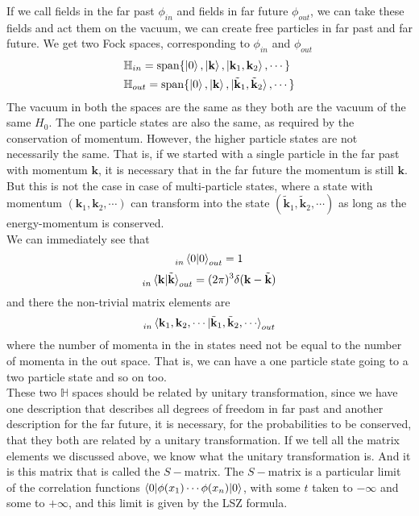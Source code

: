 \documentclass[11pt, notitlepage]{report}
\numberwithin{equation}{section}
\begin{document}
    If we call fields in the far past \(\phi_{in}\) and fields in far future \(\phi_{out}\), we can take these fields and act them on the vacuum, we can create free particles in far past and far future. We get two Fock spaces, corresponding to \(\phi_{in}\) and \(\phi_{out}\)
    \begin{align*}
        &\mathbb{H}_{in} = \mathrm{span} \{ \ket{0}, \ket{\textbf{k}}, \ket{\textbf{k}_1, \textbf{k}_2}, \cdots \}\\
        &\mathbb{H}_{out} = \mathrm{span} \{ \ket{0}, \ket{\textbf{k}}, \ket{\tilde{\textbf{k}}_1, \tilde{\textbf{k}}_2}, \cdots \}
    \end{align*}
    The vacuum in both the spaces are the same as they both are the vacuum of the same \(H_0\). The one particle states are also the same, as required by the conservation of momentum. However, the higher particle states are not necessarily the same. That is, if we started with a single particle in the far past with momentum \(\textbf{k}\), it is necessary that in the far future the momentum is still \(\textbf{k}\). But this is not the case in case of multi-particle states, where a state with momentum \((\textbf{k}_1, \textbf{k}_2, \cdots)\) can transform into the state \((\tilde{\textbf{k}}_1, \tilde{\textbf{k}}_2, \cdots)\) as long as the energy-momentum is conserved. \\
    We can immediately see that 
    \begin{equation*}
        \indices{_{in}}\braket{0|0}_{out} = 1
    \end{equation*}
    \begin{equation*}
        \indices{_{in}}\braket{\textbf{k} | \tilde{\textbf{k}}}_{out} = (2\pi)^3\delta(\textbf{k} - \tilde{\textbf{k}})
    \end{equation*} 
    and there the non-trivial matrix elements are 
    \begin{equation*}
       \indices{_{in}}\braket{\textbf{k}_1, \textbf{k}_2, \cdots | \tilde{\textbf{k}}_1, \tilde{\textbf{k}}_2, \cdots}_{out}
    \end{equation*}
    where the number of momenta in the in states need not be equal to the number of momenta in the out space. That is, we can have a one particle state going to a two particle state and so on too. \\

    These two \(\mathbb{H}\) spaces should be related by unitary transformation, since we have one description that describes all degrees of freedom in far past and another description for the far future, it is necessary, for the probabilities to be conserved, that they both are related by a unitary transformation. If we tell all the matrix elements we discussed above, we know what the unitary transformation is. And it is this matrix that is called the \(S-\)matrix. The \(S-\)matrix is a particular limit of the correlation functions \(\braket{0|\phi(x_1) \cdots \phi(x_n)|0}\), with some \(t\) taken to \(-\infty\) and some to \(+\infty\), and this limit is given by the LSZ formula. \\
\end{document}

